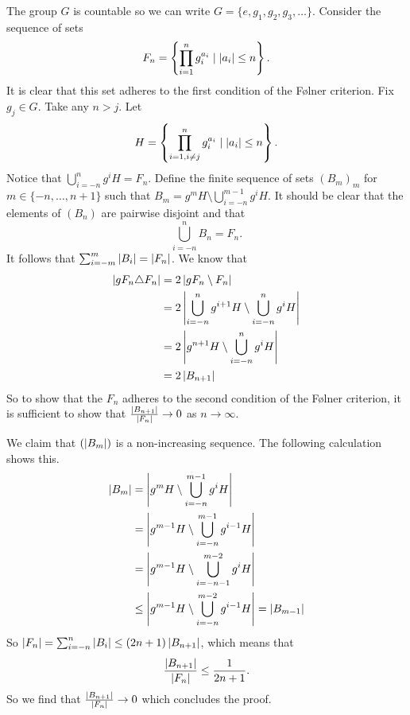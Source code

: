 The group $G$ is countable so we can write $G = \{e, g_1, g_2, g_3, \dots\}$.
Consider the sequence of sets $$F_n = \left\{\prod_{i = 1}^n g_i^{a_i} \mid \left| a_i \right| \le n\right\}.$$ 
It is clear that this set adheres to the first condition of the Følner criterion. 
Fix $g_j \in G$. Take any $n > j$.
Let $$H = \left\{\prod_{i = 1, i \ne j}^n g_i^{a_i} \mid \left| a_i \right| \le n\right\}.$$
Notice that $\bigcup_{i = -n}^{n} g^{i}H = F_n$.
Define the finite sequence of sets $(B_m)_m$ for $m \in \{-n, \dots, n+1\}$ such that  
$B_m = g^mH \setminus \bigcup_{i=-n}^{m-1}g^iH$.
It should be clear that the elements of $(B_n)$ are pairwise disjoint and that  \[
    \bigcup_{i = -n}^n B_n = F_n 
.\] 
It follows that $\sum_{i=-m}^{m} \left| B_i \right| = \left| F_n \right|$. We know that 
\begin{align*}
    \left| gF_n \triangle F_n \right| &= 2 \left| gF_n \setminus F_n \right| \\
    &= 2 \left| \bigcup_{i = -n}^n g^{i+1}H \setminus \bigcup_{i = -n}^n g^{i}H \right|\\
    &=  2 \left| g^{n+1}H \setminus \bigcup_{i = -n}^n g^{i}H \right|\\
    &= 2 \left| B_{n+1} \right|
\end{align*}
So to show that the $F_n$ adheres to the second condition of the Følner criterion, it is sufficient to show that $\frac{\left| B_{n+1} \right|}{\left| F_n \right|} \to 0$ as $n \to \infty$.

We claim that $(\left| B_m \right|)$ is a non-increasing sequence. The following calculation shows this.
\begin{align*}
    \left| B_m \right| &= \left| g^{m}H \setminus \bigcup_{i=-n}^{m-1}g^iH \right|\\
    &= \left| g^{m-1}H \setminus \bigcup_{i=-n}^{m-1}g^{i-1}H \right|\\
    &= \left| g^{m-1}H \setminus \bigcup_{i=-n-1}^{m-2}g^{i}H \right|\\
    &\le \left| g^{m-1}H \setminus \bigcup_{i=-n}^{m-2}g^{i-1}H \right| = \left| B_{m-1} \right|
\end{align*}
So $\left| F_n \right| = \sum_{i=-n}^{n} \left| B_i \right| \le (2n+1) \left| B_{n+1} \right|$, which means that $$\frac{\left| B_{n+1} \right|}{\left| F_n \right|} \le \frac{1}{2n+1}.$$
So we find that $\frac{\left| B_{n+1} \right|}{\left| F_n \right|} \to 0$ which concludes the proof. 
